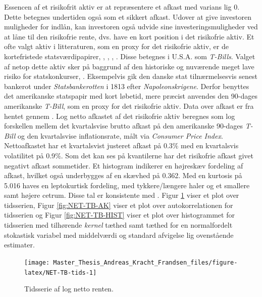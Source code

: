 \documentclass[
  a4paper,
  oneside]{memoir}
\begin{document}
Essencen af et risikofrit aktiv er at repræsentere et afkast med varians lig \(0\). Dette betegnes undertiden også som et sikkert afkast. Udover at give investoren muligheder for indlån, kan investoren også udvide sine investeringsmuligheder ved at låne til den risikofrie rente, dvs. have en kort position i det risikofrie aktiv. Et ofte valgt aktiv i litteraturen, som en proxy for det risikofrie aktiv, er de kortefristede statsværdipapirer, \citep{CampVic2003, CampVic1999}, \citep{JurVic2011}, \citep{Engsted2012}, \citep{CampVicCha2003}. Disse betegnes i U.S.A. som \emph{T-Bills}. Valget af netop dette aktiv sker på baggrund af den historiske og nuværende meget lave risiko for statskonkurser, \citep{Beers2017}. Eksempelvis gik den danske stat tilnærmelsesvis senest bankerot under \emph{Statsbankerotten} i 1813 efter \emph{Napoleonskrigene}. Derfor benyttes det amerikanske statspapir med kort løbetid, mere præcist anvendes den 90-dages amerikanske \emph{T-Bill}, som en proxy for det risikofrie aktiv. Data over afkast er fra \citep{CRSPt90} hentet gennem \citep{WRDSt90}. Log netto afkastet af det risikofrie aktiv beregnes som log forskellen mellem det kvartalsvise brutto afkast på den amerikanske 90-dages \emph{T-Bill} og den kvartalsvise inflationsrate, målt via \emph{Consumer Price Index}. Nettoafkastet har et kvartalsvist justeret afkast på 0.3\(\%\) med en kvartalsvis volatilitet på 0.9\(\%\). Som det kan ses på kvantilerne har det risikofrie afkast givet negativt afkast sommetider. Et histogram indikerer en højreskæv fordeling af afkast, hvilket også underbygges af en skævhed på 0.362. Med en kurtosis på 5.016 haves en leptokurtisk fordeling, med tykkere/længere haler og et smallere samt højere cetrum. Disse tal er konsistente med \citep{CampVic2003}. Figur \ref{fig:NET-TB-tids} viser et plot over tidsserien, Figur \ref{fig:NET-TB-AK} viser et plot over autokorrelationen for tidsserien og Figur \ref{fig:NET-TB-HIST} viser et plot over histogrammet for tidsserien med tilhørende \emph{kernel} tæthed samt tæthed for en normalfordelt stokastisk variabel med middelværdi og standard afvigelse lig ovenstående estimater.

\begin{figure}[H]

{\centering \texttt{[image: Master\_Thesis\_Andreas\_Kracht\_Frandsen\_files/figure-latex/NET-TB-tids-1]} 

}

\caption[Tidsserie af log netto renten.]{Tidsserie af log netto renten.}\label{fig:NET-TB-tids}
\end{figure}
\end{document}
